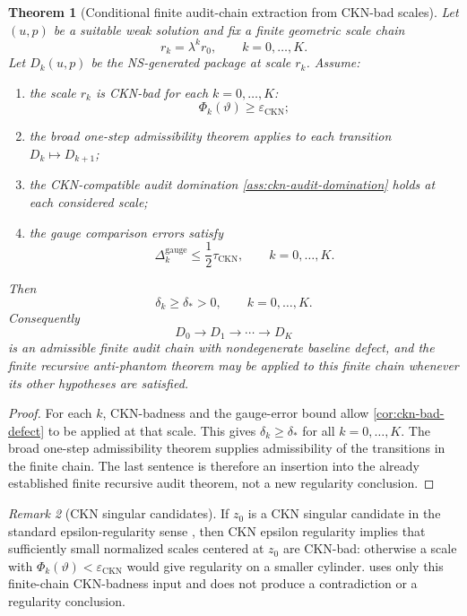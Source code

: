 \documentclass[11pt]{article}
\numberwithin{equation}{section}
\theoremstyle{plain}
\newtheorem{theorem}{Theorem}[section]
\theoremstyle{definition}
\theoremstyle{remark}
\newtheorem{remark}[theorem]{Remark}
\begin{document}
\begin{theorem}[Conditional finite audit-chain extraction from CKN-bad scales]
\label{thm:conditional-ckn-chain-extraction}
Let \((u,p)\) be a suitable weak solution and fix a finite geometric scale
chain
\[
  r_k=\lambda^k r_0,\qquad k=0,\ldots,K.
\]
Let \(D_k(u,p)\) be the NS-generated package at scale \(r_k\).  Assume:
\begin{enumerate}[label=(\alph*)]
  \item the scale \(r_k\) is CKN-bad for each \(k=0,\ldots,K\):
  \[
    \Phi_k(\vartheta)\ge\varepsilon_{\mathrm{CKN}};
  \]
  \item the broad one-step admissibility theorem applies to each transition
  \(D_k\mapsto D_{k+1}\);
  \item the CKN-compatible audit domination
  \cref{ass:ckn-audit-domination} holds at each considered scale;
  \item the gauge comparison errors satisfy
  \[
    \Delta_k^{\mathrm{gauge}}\le\frac12\tau_{\mathrm{CKN}},
    \qquad k=0,\ldots,K.
  \]
\end{enumerate}
Then
\[
  \delta_k\ge\delta_*>0,
  \qquad k=0,\ldots,K.
\]
Consequently
\[
  D_0\to D_1\to\cdots\to D_K
\]
is an admissible finite audit chain with nondegenerate baseline defect, and
the finite recursive anti-phantom theorem may be applied to this finite chain
whenever its other hypotheses are satisfied.
\end{theorem}

\begin{proof}
For each \(k\), CKN-badness and the gauge-error bound allow
\cref{cor:ckn-bad-defect} to be applied at that scale.  This gives
\(\delta_k\ge\delta_*\) for all \(k=0,\ldots,K\).  The broad one-step
admissibility theorem supplies admissibility of the transitions in the finite
chain.  The last sentence is therefore an insertion into the already
established finite recursive audit theorem, not a new regularity conclusion.
\end{proof}

\begin{remark}[CKN singular candidates]\label{rem:ckn-singular-candidates}
If \(z_0\) is a CKN singular candidate in the standard epsilon-regularity
sense \cite{CKN1982,Lin1998}, then CKN epsilon regularity implies that sufficiently small normalized
scales centered at \(z_0\) are CKN-bad: otherwise a scale with
\(\Phi_k(\vartheta)<\varepsilon_{\mathrm{CKN}}\) would give regularity on a
smaller cylinder.   uses only this
finite-chain CKN-badness input and does not produce a contradiction or a
regularity conclusion.
\end{remark}
\end{document}

